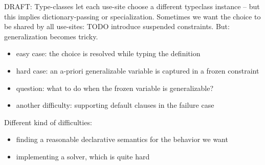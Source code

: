 \documentclass[acmsmall,screen,nonacm]{acmart}
\begin{document}
DRAFT: Type-classes let each use-site choose a different typeclass instance
-- but this implies dictionary-passing or specialization. Sometimes we want
the choice to be shared by all use-sites: TODO introduce suspended
constraints. But: generalization becomes tricky.
\begin{itemize}
\item easy case: the choice is resolved while typing the definition
\item hard case: an a-priori generalizable variable is captured in a frozen
   constraint 
\item question: what to do when the frozen variable is generalizable?
\item another difficulty: supporting default clauses in the failure case
\end{itemize}

Different kind of difficulties:
\begin{itemize}
\item finding a reasonable declarative semantics for the behavior we want
\item implementing a solver, which is quite hard
\end{itemize}



\end{document}
